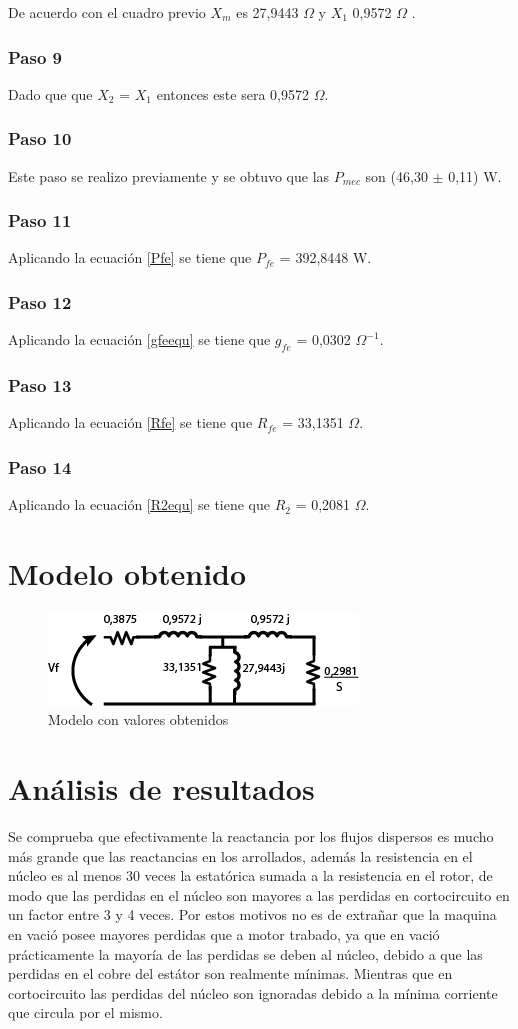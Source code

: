 \documentclass[11pt,letterpaper]{article}     %
\begin{document}
De acuerdo con el cuadro previo $X_{m}$ es 27,9443 $\Omega$ y $X_{1}$ 0,9572 $\Omega$ .
\subsubsection{Paso 9}
Dado que que $X_{2}$ = $X_{1}$ entonces este sera 0,9572 $\Omega$.
\subsubsection{Paso 10}
Este paso se realizo previamente y se obtuvo que las $P_{mec}$ son (46,30 $\pm$ 0,11) W.
\subsubsection{Paso 11}
Aplicando la ecuación \ref{Pfe} se tiene que $P_{fe}$ = 392,8448 W.
\subsubsection{Paso 12}
Aplicando la ecuación \ref{gfeequ} se tiene que $g_{fe}$ = 0,0302 $\Omega^{-1}$.
\subsubsection{Paso 13}
Aplicando la ecuación \ref{Rfe} se tiene que $R_{fe}$ = 33,1351 $\Omega$.
\subsubsection{Paso 14}
Aplicando la ecuación \ref{R2equ} se tiene que $R_{2}$ = 0,2081 $\Omega$.
\section{Modelo obtenido} 
\begin{figure}[H]
	\centering
	\includegraphics[scale=0.8]{./recursos-Lab8/modelofinal.png}
	\caption{Modelo con valores obtenidos}
	\label{fi}
\end{figure}

\newpage
\section{Análisis de resultados}
Se comprueba que efectivamente la reactancia por los flujos dispersos es mucho más grande que las reactancias en los arrollados, además la resistencia en el núcleo es al menos 30 veces la estatórica sumada a la resistencia en el rotor, de modo que las perdidas en el núcleo son mayores a las perdidas en cortocircuito en un factor entre 3 y 4 veces. Por estos motivos no es de extrañar que la maquina en vació posee mayores perdidas que a motor trabado, ya que en vació prácticamente la mayoría de las perdidas se deben al núcleo, debido a que las perdidas en el cobre del estátor son realmente mínimas. Mientras que en cortocircuito las perdidas del núcleo son ignoradas debido a la mínima corriente que circula por el mismo.
\newpage
\end{document}
